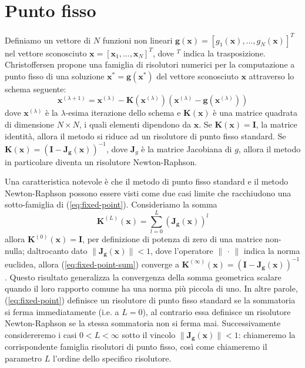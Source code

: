 \chapter{Punto fisso}
	Definiamo un vettore di $N$ funzioni non lineari $\mathbf{g(x)} = [g_{1}(\mathbf{x}), \dots , g_{N}(\mathbf{x})]^{T}$ nel vettore sconosciuto $\mathbf{x} = [\mathbf{x}_{1}, \dots , \mathbf{x}_{N}]^{T}$, dove $^T$ indica la trasposizione. Christoffersen propone una famiglia di risolutori numerici per la computazione a punto fisso di una soluzione $\mathbf{x}^{*} = \mathbf{g(x^{*})}$ del vettore sconosciuto $\mathbf{x}$ attraverso lo schema seguente:
	\begin{equation}
		\label{eq:fixed-point}
		\mathbf{x}^{(\lambda+1)} = \mathbf{x}^{(\lambda)}-\mathbf{K}(\mathbf{x}^{(\lambda)})(\mathbf{x}^{(\lambda)}-\mathbf{g}(\mathbf{x}^{(\lambda)}))
	\end{equation}
	dove $\mathbf{x}^{(\lambda)}$ è la $\lambda$-esima iterazione dello schema e $\mathbf{K(x)}$ è una matrice quadrata di dimensione $N \times N$, i quali elementi dipendono da $\mathbf{x}$. Se $\mathbf{K}(\mathbf{x}) = \mathbf{I}$, la matrice identità, allora il metodo si riduce ad un risolutore di punto fisso standard. Se $\mathbf{K}(\mathbf{x}) = (\mathbf{I}-\mathbf{J_{g}(x)})^{-1}$, dove $\mathbf{J}_{g}$ è la matrice Jacobiana di $g$, allora il metodo in particolare diventa un risolutore Newton-Raphson.
		
	Una caratteristica notevole è che il metodo di punto fisso standard e il metodo Newton-Raphson possono essere visti come due casi limite che racchiudono una sotto-famiglia di (\ref{eq:fixed-point}). Consideriamo la somma
	\begin{equation}
		\label{eq:fixed-point-sum}
		\mathbf{K}^{(L)}(\mathbf{x}) = \sum_{l=0}^{L} \left(\mathbf{J_{g}(x)}\right)^{l}
	\end{equation}
	allora $\mathbf{K}^{(0)}(\mathbf{x}) = \mathbf{I}$, per definizione di potenza di zero di una matrice non-nulla; daltrocanto dato $\lVert\mathbf{J_{g}(x)}\rVert < 1$, dove l'operatore $\lVert\,\cdot\,\rVert$ indica la norma euclidea, allora (\ref{eq:fixed-point-sum}) converge a $\mathbf{K}^{(\infty)}(\mathbf{x}) = (\mathbf{I}-\mathbf{J_{g}(x)})^{-1}$. Questo risultato generalizza la convergenza della somma geometrica scalare quando il loro rapporto comune ha una norma più piccola di uno. In altre parole, (\ref{eq:fixed-point}) definisce un risolutore di punto fisso standard se la sommatoria si ferma immediatamente (i.e. a $L = 0$), al contrario essa definisce un risolutore Newton-Raphson se la stessa sommatoria non si ferma mai. Successivamente considereremo i casi $0 < L < \infty$ sotto il vincolo $\lVert\mathbf{J_{g}(x)}\rVert < 1$: chiameremo la corrispondente famiglia risolutori di punto fisso, così come chiameremo il parametro $L$ l'ordine dello specifico risolutore.